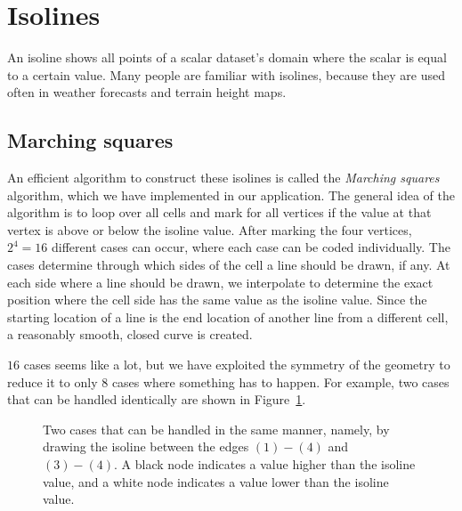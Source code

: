 \section{Isolines}
\label{sec:isolines}
An isoline shows all points of a scalar dataset's domain where the scalar is equal to a certain value.
Many people are familiar with isolines, because they are used often in weather forecasts and terrain height maps.

\subsection{Marching squares}
An efficient algorithm to construct these isolines is called the \textit{Marching squares}\cite{maple2003geometric} algorithm, which we have implemented in our application.
The general idea of the algorithm is to loop over all cells and mark for all vertices if the value at that vertex is above or below the isoline value.
After marking the four vertices, \(2^4=16\) different cases can occur, where each case can be coded individually.
The cases determine through which sides of the cell a line should be drawn, if any.
At each side where a line should be drawn, we interpolate to determine the exact position where the cell side has the same value as the isoline value.
Since the starting location of a line is the end location of another line from a different cell, a reasonably smooth, closed curve is created.

\(16\) cases seems like a lot, but we have exploited the symmetry of the geometry to reduce it to only \(8\) cases where something has to happen.
For example, two cases that can be handled identically are shown in Figure~\ref{fig:iso_example}.
\begin{figure}[htb]
    \centering
    \caption{Two cases that can be handled in the same manner, namely, by drawing the isoline between the edges \((1)-(4)\) and \((3)-(4)\). A black node indicates a value higher than the isoline value, and a white node indicates a value lower than the isoline value.}
    \label{fig:iso_example}
\end{figure}


